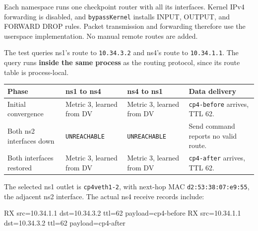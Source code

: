 \documentclass[
  a4paper,
  10pt]{article}
\newenvironment{Shaded}{}{}
\newcommand{\NormalTok}[1]{#1}
\newcounter{none} %
\begin{document}
Each namespace runs one checkpoint router with all its interfaces.
Kernel IPv4 forwarding is disabled, and \texttt{bypassKernel} installs
INPUT, OUTPUT, and FORWARD DROP rules. Packet transmission and
forwarding therefore use the userspace implementation. No manual remote
routes are added.

The test queries ns1's route to \texttt{10.34.3.2} and ns4's route to
\texttt{10.34.1.1}. The query runs \textbf{inside the same process} as
the routing protocol, since its route table is process-local.

{\def\LTcaptype{none} %
\begin{longtable}[]{@{}
  >{\raggedright\arraybackslash}p{}
  >{\raggedright\arraybackslash}p{}
  >{\raggedright\arraybackslash}p{}
  >{\raggedright\arraybackslash}p{}@{}}
\toprule\noalign{}
\begin{minipage}[b]{\linewidth}\raggedright
Phase
\end{minipage} & \begin{minipage}[b]{\linewidth}\raggedright
ns1 to ns4
\end{minipage} & \begin{minipage}[b]{\linewidth}\raggedright
ns4 to ns1
\end{minipage} & \begin{minipage}[b]{\linewidth}\raggedright
Data delivery
\end{minipage} \\
\midrule\noalign{}
\endhead
\bottomrule\noalign{}
\endlastfoot
Initial convergence & Metric 3, learned from DV & Metric 3, learned from
DV & \texttt{cp4-before} arrives, TTL 62. \\
Both ns2 interfaces down & \texttt{UNREACHABLE} & \texttt{UNREACHABLE} &
Send command reports no valid route. \\
Both interfaces restored & Metric 3, learned from DV & Metric 3, learned
from DV & \texttt{cp4-after} arrives, TTL 62. \\
\end{longtable}
}

The selected ns1 outlet is \texttt{cp4veth1-2}, with next-hop MAC
\texttt{d2:53:38:07:e9:55}, the adjacent ns2 interface. The actual ns4
receive records include:

\begin{Shaded}
\begin{Highlighting}[]
\NormalTok{RX src=10.34.1.1 dst=10.34.3.2 ttl=62 payload=cp4{-}before}
\NormalTok{RX src=10.34.1.1 dst=10.34.3.2 ttl=62 payload=cp4{-}after}
\end{Highlighting}
\end{Shaded}
\end{document}
